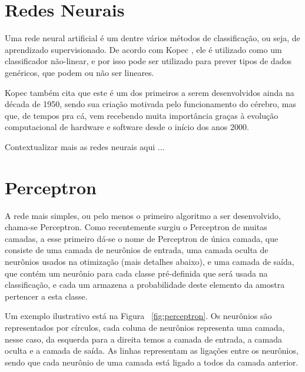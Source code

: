 \section{Redes Neurais}

Uma rede neural artificial é um dentre vários métodos de classificação, ou seja, de aprendizado supervisionado. De acordo com Kopec \citep{classic}, ele é utilizado como um classificador não-linear, e por isso pode ser utilizado para prever tipos de dados genéricos, que podem ou não ser lineares. 

Kopec \citep{classic} também cita que este é um dos primeiros a serem desenvolvidos ainda na década de 1950, sendo sua criação motivada pelo funcionamento do cérebro, mas que, de tempos pra cá, vem recebendo muita importância graças à evolução computacional de hardware e software desde o início dos anos 2000.

Contextualizar mais as redes neurais aqui ...

\section{Perceptron}

A rede mais simples, ou pelo menos o primeiro algoritmo a ser desenvolvido, chama-se Perceptron. Como recentemente surgiu o Perceptron de muitas camadas, a esse primeiro dá-se o nome de Perceptron de única camada, que consiste de uma camada de neurônios de entrada, uma camada oculta de neurônios usados na otimização (mais detalhes abaixo), e uma camada de saída, que contém um neurônio para cada classe pré-definida que será usada na classificação, e cada um armazena a probabilidade deste elemento da amostra pertencer a esta classe.

Um exemplo ilustrativo está na Figura ~\ref{fig:perceptron}. Os neurônios são representados por círculos, cada coluna de neurônios representa uma camada, nesse caso, da esquerda para a direita temos a camada de entrada, a camada oculta e a camada de saída. As linhas representam as ligações entre os neurônios, sendo que cada neurônio de uma camada está ligado a todos da camada anterior.

